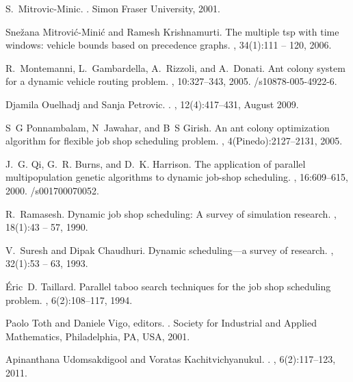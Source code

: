 \documentclass[review]{elsarticle}
\begin{document}
\begin{thebibliography}{10}
S.~Mitrovic-Minic.
.
\newblock Simon Fraser University, 2001.

Snežana Mitrović-Minić and Ramesh Krishnamurti.
\newblock The multiple tsp with time windows: vehicle bounds based on
  precedence graphs.
, 34(1):111 -- 120, 2006.

R.~Montemanni, L.~Gambardella, A.~Rizzoli, and A.~Donati.
\newblock Ant colony system for a dynamic vehicle routing problem.
, 10:327--343, 2005.
/s10878-005-4922-6.

Djamila Ouelhadj and Sanja Petrovic.
.
, 12(4):417--431, August 2009.

S~G Ponnambalam, N~Jawahar, and B~S Girish.
\newblock An ant colony optimization algorithm for flexible job shop scheduling
  problem.
, 4(Pinedo):2127--2131, 2005.

J.~G. Qi, G.~R. Burns, and D.~K. Harrison.
\newblock The application of parallel multipopulation genetic algorithms to
  dynamic job-shop scheduling.
,
  16:609--615, 2000.
/s001700070052.

R.~Ramasesh.
\newblock Dynamic job shop scheduling: A survey of simulation research.
, 18(1):43 -- 57, 1990.

V.~Suresh and Dipak Chaudhuri.
\newblock Dynamic scheduling—a survey of research.
, 32(1):53 -- 63,
  1993.

{\'E}ric~D. Taillard.
\newblock Parallel taboo search techniques for the job shop scheduling problem.
, 6(2):108--117, 1994.

Paolo Toth and Daniele Vigo, editors.
.
\newblock Society for Industrial and Applied Mathematics, Philadelphia, PA,
  USA, 2001.

Apinanthana Udomsakdigool and Voratas Kachitvichyanukul.
.
, 6(2):117--123, 2011.


\end{thebibliography}
\end{document}
